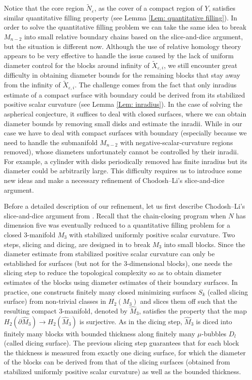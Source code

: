 \documentclass[11pt,letterpaper]{amsart}
\numberwithin{equation}{section}
\theoremstyle{definition}
\newcommand{\ve}{\varepsilon}
\begin{document}
Notice that the core region $\tilde N_\ve$, as the cover of a compact region of $Y$, satisfies similar quantitative filling property (see Lemma \ref{Lem: quantitative filling}). In order to solve the quantitative filling problem we can take the same idea to break $M_{n-2}$ into small relative boundary chains based on the slice-and-dice argument, but the situation is different now. Although the use of relative homology theory appears to be very effective to handle the issue caused by the lack of uniform diameter control for the blocks around infinity of $\tilde X_{\ve,i}$, we still encounter great difficulty in obtaining diameter bounds for the remaining blocks that stay away from the infinity of $\tilde X_{\ve,i}$. The challenge comes from the fact that only inradius estimate of a compact surface with boundary could be derived from its stabilized positive scalar curvature (see Lemma \ref{Lem: inradius}). In the case of solving the aspherical conjecture, it suffices to deal with closed surfaces, where we can obtain diameter bounds by removing small disks and estimate the inradii. While in our case we have to deal with compact surfaces with boundary (especially because we need to handle the submanifold $M_{n-2}$ with negative-scalar-curvature regions removed), whose diameters unfortunately cannot be controlled by their inradii. For example, a cylinder with disks periodically removed  has finite inradius but its diameter could be arbitrarily large. This difficulty requires us to introduce some new ideas and make a necessary refinement of Chodosh--Li's slice-and-dice argument.

Before a detailed description of our refinement, let us first describe Chodosh--Li's slice-and-dice argument from \cite{CL20}. Recall that the chain-closing program when $N$ has dimension five was eventually reduced to a quantitative filling problem for a closed $3$-manifold $M_3$ with stabilized uniformly positive scalar curvature. Two steps, slicing and dicing, are designed in \cite{CL20} to break $M_3$ into small blocks. Since the diameter estimate from stabilized positive scalar curvature can only be established for surfaces (but not for the $3$-dimensional blocks), one needs the slicing step to reduce the topological complexity so as to obtain diameter estimates of the blocks using diameter estimates of their boundary surfaces.
In practice, one constructs finitely many closed minimizing surfaces $S_k$ (called slicing surface) from non-trivial classes in $H_2(M_3)$ and slices them off such that the resulting compact $3$-manifold, denoted by $\hat M_3$, satisfies the property that the map $H_2(\partial\hat M_3) \to H_2(\hat M_3)$ is surjective. As in the dicing step, $\hat M_3$ is diced into finitely many blocks with bounded thickness along finitely many $\mu$-bubbles $D_l$ (called dicing surface). The previous slicing step guarantees that for each block the thickness is measured from exactly one dicing surface, for which the diameter of the blocks can be derived from that of the slicing surfaces (obtained from stabilized uniformly positive scalar curvature) as well as the bounded thickness.
\end{document}
